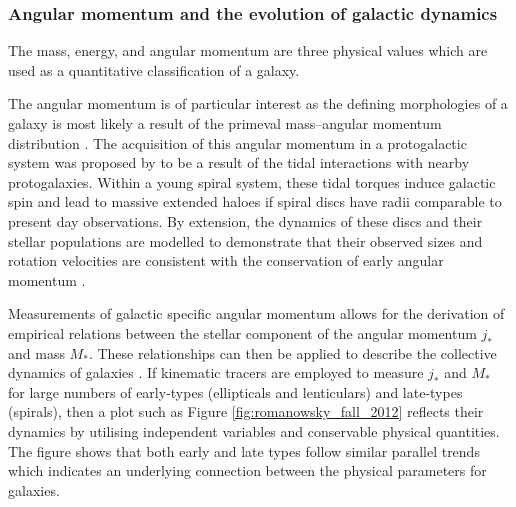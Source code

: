 \documentclass[12pt, twocolumn, nofootinbib]{revtex4-1}    %
\begin{document}
\subsubsection{Angular momentum and the evolution of galactic dynamics}
\noindent
The mass, energy, and angular momentum are three physical values which are used as a quantitative classification of a galaxy. 

The angular momentum is of particular interest as the defining morphologies of a galaxy is most likely a result of the primeval mass--angular momentum distribution \citep{1970ApJ...160..831S}. The acquisition of this angular momentum in a protogalactic system was proposed by \cite{1969ApJ...155..393P} to be a result of the tidal interactions with nearby protogalaxies. Within a young spiral system, these tidal torques induce galactic spin and lead to massive extended haloes if spiral discs have radii comparable to present day observations. By extension, the dynamics of these discs and their stellar populations are modelled to demonstrate that their observed sizes and rotation velocities are consistent with the conservation of early angular momentum \citep{1998MNRAS.295..319M, 1997ApJ...482..659D}. 

Measurements of galactic specific angular momentum allows for the derivation of empirical relations between the stellar component of the angular momentum $j_*$ and mass $M_*$. These relationships can then be applied to describe the collective dynamics of galaxies \citep{fall1983}. If kinematic tracers are employed to measure $j_*$ and $M_*$ for large numbers of early-types (ellipticals and lenticulars) and late-types (spirals), then a plot such as Figure \ref{fig:romanowsky_fall_2012} reflects their dynamics by utilising independent variables and conservable physical quantities. The figure shows that both early and late types follow similar parallel trends which indicates an underlying connection between the physical parameters for galaxies. 
\end{document}
